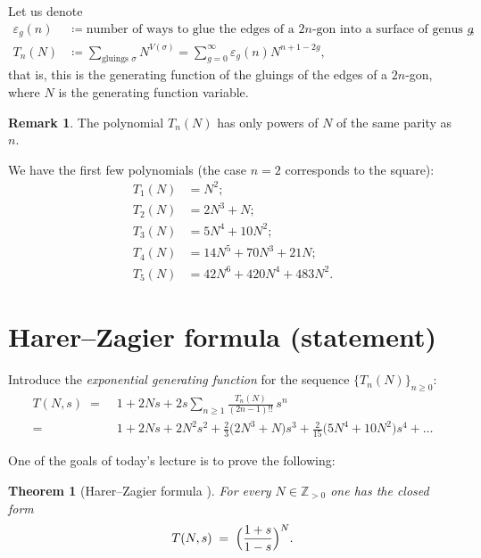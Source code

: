 \documentclass[letterpaper,11pt,oneside,reqno]{book}
\numberwithin{equation}{chapter}  %
\newtheorem{theorem}[proposition]{Theorem}
\theoremstyle{definition}
\newtheorem{remark}[proposition]{Remark}
\begin{document}
Let us denote
\begin{align}
	\label{lecture15:eq:epsg-def}
	\varepsilon_g(n)
	&\coloneqq\text{number of ways to glue the edges of a $2n$-gon into a surface of genus $g$},\\
	\label{lecture15:eq:Tn-def}
	T_n(N)
	&\coloneqq
	\sum_{\text{gluings }\sigma}N^{V(\sigma)}
	=
	\sum_{g=0}^{\infty}\varepsilon_g(n)N^{n+1-2g},
\end{align}
that is, this is the generating function
of the gluings of the edges of a $2n$-gon, where
$N$ is the generating function variable.

\begin{remark}
The polynomial $T_n(N)$ has only powers of $N$ of the same parity as $n$.
\end{remark}

We have the first few polynomials
(the case $n=2$ corresponds to the square):
\begin{align*}
	T_1(N)&=N^2;\\
	T_2(N)&=2N^3+N;\\
	T_3(N)&=5N^4+10N^2;\\
	T_4(N)&=14N^5+70N^3+21N;\\
	T_5(N)&=42N^6+420N^4+483N^2.
\end{align*}

\section{Harer–Zagier formula (statement)}


Introduce the \emph{exponential generating function}
for the sequence $\{T_n(N)\}_{n\ge 0}$:
\begin{equation}\label{lecture15:eq:TNs-def} %
  \begin{split}
    T(N,s)\;=&\;1+2Ns
            +2s\sum_{n\ge 1}\frac{T_n(N)}{(2n-1)!!}\,s^{n}
        \\
       =&\;
        1+2Ns+2N^{2}s^{2}
        +\frac{2}{3}\bigl(2N^{3}+N\bigr)s^{3}
        +\frac{2}{15}\bigl(5N^{4}+10N^{2}\bigr)s^{4}
        +\dots
  \end{split}
\end{equation}

One of the goals of today's lecture is to prove the following:
\begin{theorem}
	[Harer–Zagier formula \cite{harer1986euler}]
	\label{lecture15:thm:HZ-genfun}
	For every $N\in\mathbb{Z}_{>0}$ one has the closed form
\begin{equation}\label{lecture15:eq:TNs-closed}
  T(N,s)\;=\;\Bigl(\frac{1+s}{1-s}\Bigr)^{N}.
\end{equation}
\end{theorem}
\end{document}
